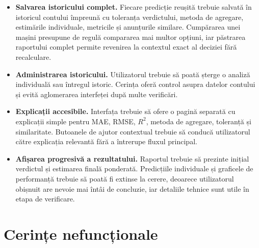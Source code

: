 \begin{itemize}
    \item \textbf{Salvarea istoricului complet.} Fiecare predicție reușită trebuie salvată în istoricul contului împreună cu toleranța verdictului, metoda de agregare, estimările individuale, metricile și anunțurile similare. Cumpărarea unei mașini presupune de regulă compararea mai multor opțiuni, iar păstrarea raportului complet permite revenirea la contextul exact al deciziei fără recalculare.
    \item \textbf{Administrarea istoricului.} Utilizatorul trebuie să poată șterge o analiză individuală sau întregul istoric. Cerința oferă control asupra datelor contului și evită aglomerarea interfeței după multe verificări.
    \item \textbf{Explicații accesibile.} Interfața trebuie să ofere o pagină separată cu explicații simple pentru MAE, RMSE, \(R^2\), metoda de agregare, toleranță și similaritate. Butoanele de ajutor contextual trebuie să conducă utilizatorul către explicația relevantă fără a întrerupe fluxul principal.
    \item \textbf{Afișarea progresivă a rezultatului.} Raportul trebuie să prezinte inițial verdictul și estimarea finală ponderată. Predicțiile individuale și graficele de performanță trebuie să poată fi extinse la cerere, deoarece utilizatorul obișnuit are nevoie mai întâi de concluzie, iar detaliile tehnice sunt utile în etapa de verificare.
\end{itemize}

\section{Cerințe nefuncționale}
\label{sec:req-nonfunctional}

